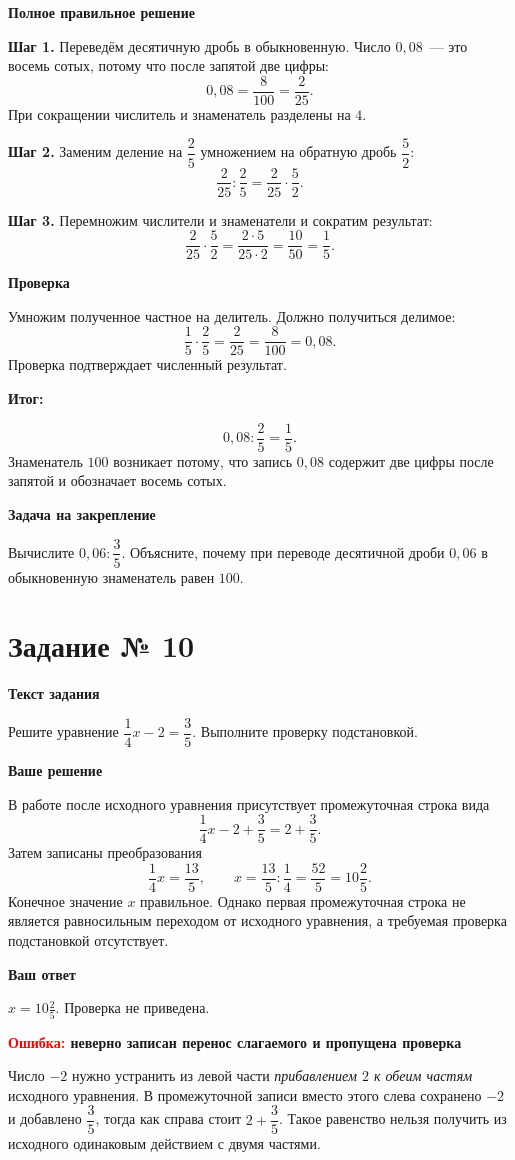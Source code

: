 \documentclass[11pt,a4paper]{article}
\newcommand{\reviewpart}[1]{\par\smallskip\textbf{#1}\par\smallskip}
\begin{document}
\reviewpart{Полное правильное решение}
\textbf{Шаг 1.} Переведём десятичную дробь в обыкновенную. Число $0{,}08$~--- это восемь сотых, потому что после запятой две цифры:
\[
0{,}08=\frac8{100}=\frac2{25}.
\]
При сокращении числитель и знаменатель разделены на $4$.

\textbf{Шаг 2.} Заменим деление на $\dfrac25$ умножением на обратную дробь $\dfrac52$:
\[
\frac2{25}:\frac25=\frac2{25}\cdot\frac52.
\]

\textbf{Шаг 3.} Перемножим числители и знаменатели и сократим результат:
\[
\frac2{25}\cdot\frac52=\frac{2\cdot5}{25\cdot2}=\frac{10}{50}=\frac15.
\]

\reviewpart{Проверка}
Умножим полученное частное на делитель. Должно получиться делимое:
\[
\frac15\cdot\frac25=\frac2{25}=\frac8{100}=0{,}08.
\]
Проверка подтверждает численный результат.

\reviewpart{\textcolor{teal!60!black}{Итог:}}
\[
\boxed{0{,}08:\frac25=\frac15.}
\]
Знаменатель $100$ возникает потому, что запись $0{,}08$ содержит две цифры после запятой и обозначает восемь сотых.

\reviewpart{Задача на закрепление}
Вычислите $0{,}06:\dfrac35$. Объясните, почему при переводе десятичной дроби $0{,}06$ в обыкновенную знаменатель равен $100$.

\clearpage
{}\label{task:10}
\section*{Задание № 10}
\reviewpart{Текст задания}
Решите уравнение $\dfrac14x-2=\dfrac35$. Выполните проверку подстановкой.

\reviewpart{Ваше решение}
В работе после исходного уравнения присутствует промежуточная строка вида
\[
\frac14x-2+\frac35=2+\frac35.
\]
Затем записаны преобразования
\[
\frac14x=\frac{13}{5},\qquad
x=\frac{13}{5}:\frac14=\frac{52}{5}=10\frac25.
\]
Конечное значение $x$ правильное. Однако первая промежуточная строка не является равносильным переходом от исходного уравнения, а требуемая проверка подстановкой отсутствует.

\reviewpart{Ваш ответ}
$\displaystyle x=10\frac25$. Проверка не приведена.

\reviewpart{\textcolor{red}{Ошибка:} неверно записан перенос слагаемого и пропущена проверка}
Число $-2$ нужно устранить из левой части \emph{прибавлением $2$ к обеим частям} исходного уравнения. В промежуточной записи вместо этого слева сохранено $-2$ и добавлено $\dfrac35$, тогда как справа стоит $2+\dfrac35$. Такое равенство нельзя получить из исходного одинаковым действием с двумя частями.
\end{document}
